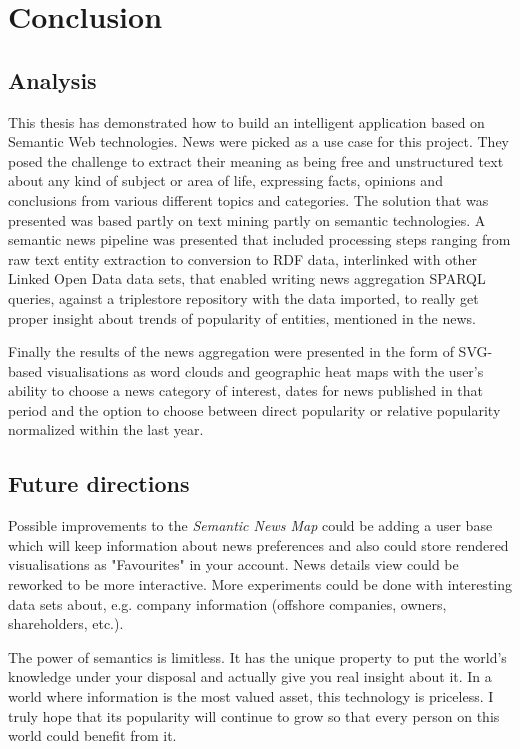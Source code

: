 \let\cleardoublepage\clearpage
\chapter{Conclusion}
\section{Analysis}
This thesis has demonstrated how to build an intelligent application based on Semantic Web technologies. News were picked as a use case for this project. They posed the challenge to extract their meaning as being free and unstructured text about any kind of subject or area of life, expressing facts, opinions and conclusions from various different topics and categories. The solution that was presented was based partly on text mining partly on semantic technologies. A semantic news pipeline was presented that included processing steps ranging from raw text entity extraction to conversion to RDF data, interlinked with other Linked Open Data data sets, that enabled writing news aggregation SPARQL queries, against a triplestore repository with the data imported, to really get proper insight about trends of popularity of entities, mentioned in the news.

Finally the results of the news aggregation were presented in the form of SVG-based visualisations as word clouds and geographic heat maps with the user's ability to choose a news category of interest, dates for news published in that period and the option to choose between direct popularity or relative popularity normalized within the last year.

\section{Future directions}
Possible improvements to the \textit{Semantic News Map} could be adding a user base which will keep information about news preferences and also could store rendered visualisations as "Favourites" in your account. News details view could be reworked to be more interactive. More experiments could be done with interesting data sets about, e.g. company information (offshore companies, owners, shareholders, etc.). 

The power of semantics is limitless. It has the unique property to put the world's knowledge under your disposal and actually give you real insight about it. In a world where information is the most valued asset, this technology is priceless. I truly hope that its popularity will continue to grow so that every person on this world could benefit from it.